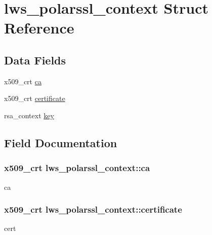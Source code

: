 \hypertarget{structlws__polarssl__context}{}\section{lws\+\_\+polarssl\+\_\+context Struct Reference}
\label{structlws__polarssl__context}
\subsection*{Data Fields}
\begin{DoxyCompactItemize}
\item 
x509\+\_\+crt \hyperlink{structlws__polarssl__context_a1872f2ea24878d807ae20ca8513674af}{ca}
\item 
x509\+\_\+crt \hyperlink{structlws__polarssl__context_ae7e11c9129ff71c7ee71b3b2e320ff27}{certificate}
\item 
rsa\+\_\+context \hyperlink{structlws__polarssl__context_a919c33af37aab170f828d954de1fa270}{key}
\end{DoxyCompactItemize}


\subsection{Field Documentation}
\subsubsection[{\texorpdfstring{ca}{ca}}]{\setlength{\rightskip}{0pt plus 5cm}x509\+\_\+crt lws\+\_\+polarssl\+\_\+context\+::ca}\hypertarget{structlws__polarssl__context_a1872f2ea24878d807ae20ca8513674af}{}\label{structlws__polarssl__context_a1872f2ea24878d807ae20ca8513674af}
ca 
\subsubsection[{\texorpdfstring{certificate}{certificate}}]{\setlength{\rightskip}{0pt plus 5cm}x509\+\_\+crt lws\+\_\+polarssl\+\_\+context\+::certificate}\hypertarget{structlws__polarssl__context_ae7e11c9129ff71c7ee71b3b2e320ff27}{}\label{structlws__polarssl__context_ae7e11c9129ff71c7ee71b3b2e320ff27}
cert 
